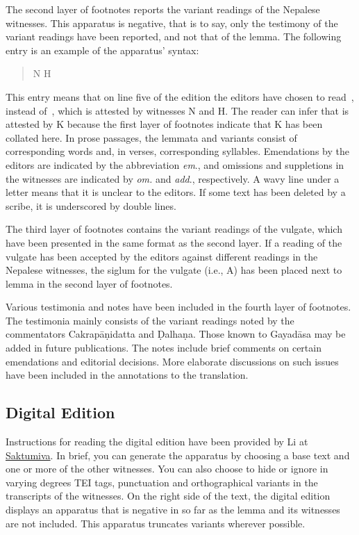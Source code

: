 The second layer of footnotes reports the variant readings of the Nepalese witnesses. This apparatus is negative, that is to say, only the testimony of the variant readings have been reported, and not that of the lemma. The following entry is an example of the apparatus' syntax:
\begin{quote}
\dev{5 pratanuṃ ]  pratanū} N H 
\end{quote}
This entry means that on line five of the edition the editors have chosen to read 
\,, instead of \,, which is attested by witnesses N and H. The 
reader can infer that  is attested by K because the first layer of footnotes 
indicate that K has been collated here. In prose passages, the lemmata and 
variants consist of corresponding words and, in verses, corresponding syllables. Emendations by the editors are indicated by the abbreviation \emph{em}., and omissions and suppletions in the witnesses are indicated by \emph{om.} and \emph{add}., respectively. A wavy line under a letter means that it is unclear to the editors. If some text has been deleted by a scribe, it is underscored by double lines. 

The third layer of footnotes contains the variant readings of the vulgate, which have been presented in the same format as the second layer. If a reading of the vulgate has been accepted by the editors against different readings in the Nepalese witnesses, the siglum for the vulgate (i.e., A) has been placed next to lemma in the second layer of footnotes. 

Various testimonia and notes have been included in the fourth layer of footnotes. The testimonia mainly consists of the variant readings noted by the commentators Cakrapāṇidatta and Ḍalhaṇa. Those known to Gayadāsa may be added in future publications. The notes include brief comments on certain emendations and editorial decisions. More elaborate discussions on such issues have been included in the annotations to the translation.

\subsection{Digital Edition}
Instructions for reading the digital edition have been provided by  Li at 
\href{https://saktumiva.org/wiki/users}{Saktumiva}. In brief, you can 
generate the apparatus by choosing a base text and one or more of the other 
witnesses. You can also choose to hide or ignore in varying degrees TEI 
tags, punctuation and orthographical variants in the transcripts of the witnesses. 
On the right side of the text, the digital edition displays an apparatus that is 
negative in so far as the lemma and its witnesses are not included. This apparatus 
truncates variants wherever possible. 

